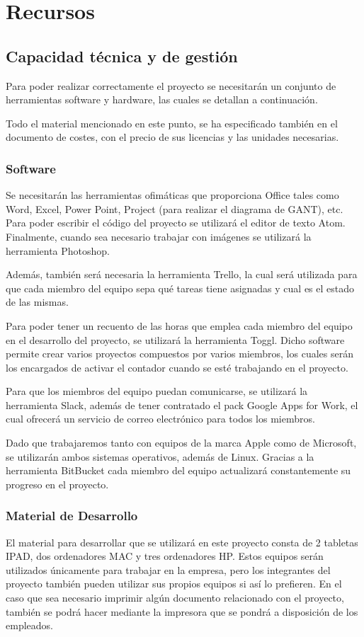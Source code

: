 \section{Recursos}

\clearpage

\subsection{Capacidad técnica y de gestión}
\par{Para poder realizar correctamente el proyecto se necesitarán un conjunto de herramientas software y hardware, las cuales se detallan a continuación. }
\par{Todo el material mencionado en este punto, se ha especificado también en el documento de costes, con el precio de sus licencias y las unidades necesarias.}

\subsubsection{Software}
\par{Se necesitarán las herramientas ofimáticas que proporciona Office tales como Word, Excel, Power Point, Project (para realizar el diagrama de GANT), etc. Para poder escribir el código del proyecto se utilizará el editor de texto Atom. Finalmente, cuando sea necesario trabajar con imágenes se utilizará la herramienta Photoshop.}
\par{Además, también será necesaria la herramienta Trello, la cual será utilizada para que cada miembro del equipo sepa qué tareas tiene asignadas y cual es el estado  de las mismas. }
\par{Para poder tener un recuento de las horas que emplea cada miembro del equipo en el desarrollo del proyecto, se utilizará la herramienta Toggl. Dicho software permite crear varios proyectos compuestos por varios miembros, los cuales serán los encargados de activar el contador cuando se esté trabajando en el proyecto.}
\par{Para que los miembros del equipo puedan comunicarse, se utilizará la herramienta Slack, además de tener contratado el pack Google Apps for Work, el cual ofrecerá un servicio de correo electrónico para todos los miembros. }
\par{Dado que trabajaremos tanto con equipos de la marca Apple como de Microsoft, se utilizarán ambos sistemas operativos, además de Linux. Gracias a la herramienta BitBucket cada miembro del equipo actualizará constantemente su progreso en el proyecto.}

\subsubsection{Material de Desarrollo}
\par El material para desarrollar que se utilizará en este proyecto consta de 2 tabletas IPAD, dos ordenadores MAC y tres ordenadores HP. Estos equipos serán utilizados únicamente para trabajar en la empresa, pero los integrantes del proyecto también pueden utilizar sus propios equipos si así lo prefieren. En el caso que sea necesario imprimir algún documento relacionado con el proyecto, también se podrá hacer mediante la impresora que se pondrá a disposición de los empleados.
